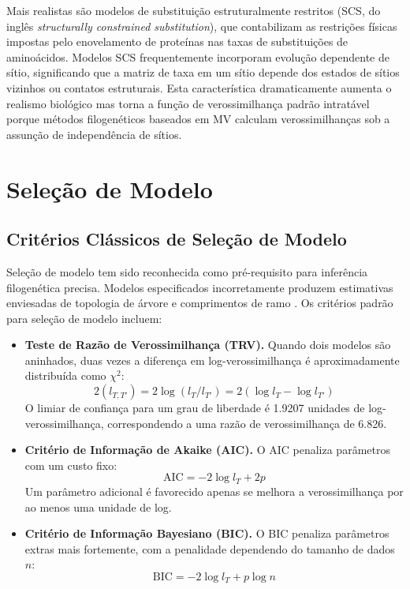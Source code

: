 Mais realistas são modelos de substituição estruturalmente restritos (SCS, do inglês \textit{structurally constrained substitution}), que contabilizam as restrições físicas impostas pelo enovelamento de proteínas nas taxas de substituições de aminoácidos. Modelos SCS frequentemente incorporam evolução dependente de sítio, significando que a matriz de taxa em um sítio depende dos estados de sítios vizinhos ou contatos estruturais. Esta característica dramaticamente aumenta o realismo biológico mas torna a função de verossimilhança padrão intratável porque métodos filogenéticos baseados em MV calculam verossimilhanças sob a assunção de independência de sítios.

\section{Seleção de Modelo}

\subsection{Critérios Clássicos de Seleção de Modelo}

Seleção de modelo tem sido reconhecida como pré-requisito para inferência filogenética precisa. Modelos especificados incorretamente produzem estimativas enviesadas de topologia de árvore e comprimentos de ramo \parencite{buckley2002,sanderson2002,abadi2019}. Os critérios padrão para seleção de modelo incluem:

\begin{itemize}
    \item \textbf{Teste de Razão de Verossimilhança (TRV).} Quando dois modelos são aninhados, duas vezes a diferença em log-verossimilhança é aproximadamente distribuída como $\chi^2$:
    $$2(l_{T,T'}) = 2\log(l_T / l_{T'}) = 2(\log l_T - \log l_{T'})$$
    O limiar de confiança para um grau de liberdade é 1.9207 unidades de log-verossimilhança, correspondendo a uma razão de verossimilhança de 6.826.

    \item \textbf{Critério de Informação de Akaike (AIC).} O AIC \parencite{akaike1974} penaliza parâmetros com um custo fixo:
    $$\mathrm{AIC} = -2\log l_T + 2p$$
    Um parâmetro adicional é favorecido apenas se melhora a verossimilhança por ao menos uma unidade de log.

    \item \textbf{Critério de Informação Bayesiano (BIC).} O BIC \parencite{schwarz1978} penaliza parâmetros extras mais fortemente, com a penalidade dependendo do tamanho de dados $n$:
    $$\mathrm{BIC} = -2\log l_T + p\log n$$
\end{itemize}

